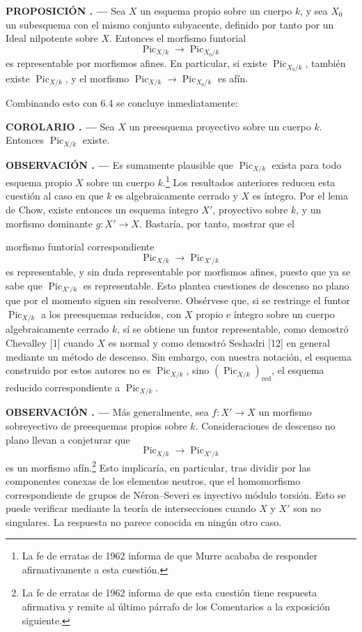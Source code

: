 \documentclass[11pt,twoside,openany]{book}
\numberwithin{equation}{section}
\newcommand{\src}[1]{%
  \phantomsection\hypertarget{src:#1}{}%
  \marginpar{\raggedleft\footnotesize\sffamily #1}%
}
\theoremstyle{plain}
\theoremstyle{definition}
\theoremstyle{remark}
\newcommand{\result}[2]{%
  \par\medskip\noindent\textbf{#1%
  \if\relax\detokenize{#2}\relax\else\space#2\fi. ---}\enspace
}
\newcommand{\FgaUnitKey}{frontmatter}
\renewcommand{\src}[1]{%
  \phantomsection\hypertarget{src:\FgaUnitKey:#1}{}%
  \marginpar{\raggedleft\footnotesize\sffamily #1}%
}
\theoremstyle{plain}
\theoremstyle{definition}
\theoremstyle{remark}
\begin{document}
\result{PROPOSICIÓN}{6.5} Sea $X$ un esquema propio sobre un cuerpo $k$, y sea
$X_0$ un subesquema con el mismo conjunto subyacente, definido por tanto por un
Ideal nilpotente sobre $X$. Entonces el morfismo funtorial
\[
\operatorname{Pic}_{X/k}\longrightarrow\operatorname{Pic}_{X_0/k}
\]
es representable por morfismos afines. En particular, si existe
$\operatorname{Pic}_{X_0/k}$, también existe $\operatorname{Pic}_{X/k}$, y el
morfismo $\operatorname{Pic}_{X/k}\longrightarrow\operatorname{Pic}_{X_0/k}$
es afín.

Combinando esto con 6.4 se concluye inmediatamente:

\result{COROLARIO}{6.6} Sea $X$ un preesquema proyectivo sobre un cuerpo $k$.
Entonces $\operatorname{Pic}_{X/k}$ existe.

\result{OBSERVACIÓN}{6.6} Es sumamente plausible que
$\operatorname{Pic}_{X/k}$ exista para todo esquema propio $X$ sobre un cuerpo
$k$.\footnote{La fe de erratas de 1962 informa de que Murre acababa de responder
afirmativamente a esta cuestión.} Los resultados anteriores reducen esta
cuestión al caso en que $k$ es algebraicamente cerrado y $X$ es íntegro. Por el
lema de Chow, existe entonces un esquema íntegro $X'$, proyectivo sobre $k$, y
un morfismo dominante $g:X'\longrightarrow X$. Bastaría, por tanto, mostrar que
el

\src{160}
morfismo funtorial correspondiente
\[
\operatorname{Pic}_{X/k}\longrightarrow\operatorname{Pic}_{X'/k}
\]
es representable, y sin duda representable por morfismos afines, puesto que ya
se sabe que $\operatorname{Pic}_{X'/k}$ es representable. Esto plantea
cuestiones de descenso no plano que por el momento siguen sin resolverse.
Obsérvese que, si se restringe el funtor $\operatorname{Pic}_{X/k}$ a los
preesquemas reducidos, con $X$ propio e íntegro sobre un cuerpo algebraicamente
cerrado $k$, sí se obtiene un funtor representable, como demostró Chevalley [1]
cuando $X$ es normal y como demostró Seshadri [12] en general mediante un
método de descenso. Sin embargo, con nuestra notación, el esquema construido
por estos autores no es $\operatorname{Pic}_{X/k}$, sino
$(\operatorname{Pic}_{X/k})_{\mathrm{red}}$, el esquema reducido correspondiente
a $\operatorname{Pic}_{X/k}$.

\result{OBSERVACIÓN}{6.7} Más generalmente, sea $f:X'\longrightarrow X$ un
morfismo sobreyectivo de preesquemas propios sobre $k$. Consideraciones de
descenso no plano llevan a conjeturar que
\[
\operatorname{Pic}_{X/k}\longrightarrow\operatorname{Pic}_{X'/k}
\]
es un morfismo afín.\footnote{La fe de erratas de 1962 informa de que esta cuestión
tiene respuesta afirmativa y remite al último párrafo de los Comentarios a la
exposición siguiente.} Esto implicaría, en particular, tras dividir por las
componentes conexas de los elementos neutros, que el homomorfismo
correspondiente de grupos de Néron--Severi es inyectivo módulo torsión. Esto se
puede verificar mediante la teoría de intersecciones cuando $X$ y $X'$ son no
singulares. La respuesta no parece conocida en ningún otro caso.
\end{document}
